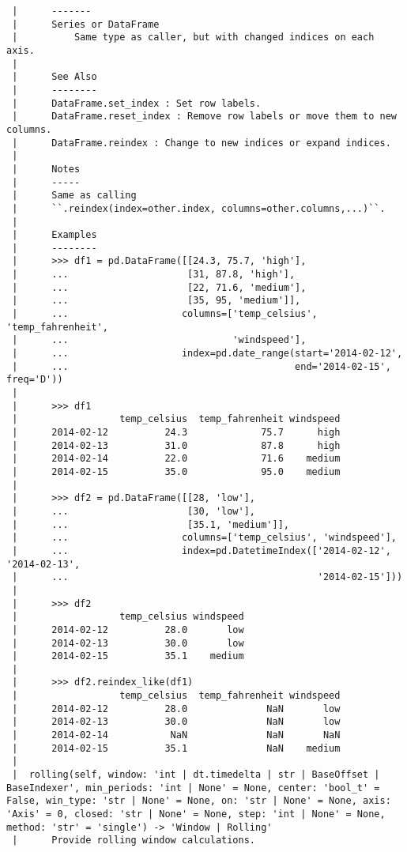 \documentclass[
  letterpaper,
  DIV=11,
  numbers=noendperiod]{scrreprt}
\begin{document}
\begin{verbatim}
 |      -------
 |      Series or DataFrame
 |          Same type as caller, but with changed indices on each axis.
 |      
 |      See Also
 |      --------
 |      DataFrame.set_index : Set row labels.
 |      DataFrame.reset_index : Remove row labels or move them to new columns.
 |      DataFrame.reindex : Change to new indices or expand indices.
 |      
 |      Notes
 |      -----
 |      Same as calling
 |      ``.reindex(index=other.index, columns=other.columns,...)``.
 |      
 |      Examples
 |      --------
 |      >>> df1 = pd.DataFrame([[24.3, 75.7, 'high'],
 |      ...                     [31, 87.8, 'high'],
 |      ...                     [22, 71.6, 'medium'],
 |      ...                     [35, 95, 'medium']],
 |      ...                    columns=['temp_celsius', 'temp_fahrenheit',
 |      ...                             'windspeed'],
 |      ...                    index=pd.date_range(start='2014-02-12',
 |      ...                                        end='2014-02-15', freq='D'))
 |      
 |      >>> df1
 |                  temp_celsius  temp_fahrenheit windspeed
 |      2014-02-12          24.3             75.7      high
 |      2014-02-13          31.0             87.8      high
 |      2014-02-14          22.0             71.6    medium
 |      2014-02-15          35.0             95.0    medium
 |      
 |      >>> df2 = pd.DataFrame([[28, 'low'],
 |      ...                     [30, 'low'],
 |      ...                     [35.1, 'medium']],
 |      ...                    columns=['temp_celsius', 'windspeed'],
 |      ...                    index=pd.DatetimeIndex(['2014-02-12', '2014-02-13',
 |      ...                                            '2014-02-15']))
 |      
 |      >>> df2
 |                  temp_celsius windspeed
 |      2014-02-12          28.0       low
 |      2014-02-13          30.0       low
 |      2014-02-15          35.1    medium
 |      
 |      >>> df2.reindex_like(df1)
 |                  temp_celsius  temp_fahrenheit windspeed
 |      2014-02-12          28.0              NaN       low
 |      2014-02-13          30.0              NaN       low
 |      2014-02-14           NaN              NaN       NaN
 |      2014-02-15          35.1              NaN    medium
 |  
 |  rolling(self, window: 'int | dt.timedelta | str | BaseOffset | BaseIndexer', min_periods: 'int | None' = None, center: 'bool_t' = False, win_type: 'str | None' = None, on: 'str | None' = None, axis: 'Axis' = 0, closed: 'str | None' = None, step: 'int | None' = None, method: 'str' = 'single') -> 'Window | Rolling'
 |      Provide rolling window calculations.

\end{verbatim}
\end{document}
